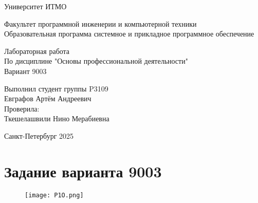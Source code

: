 

\thispagestyle{empty}
\begin{center}
\LARGE{Университет ИТМО} 
\vspace{20pt}

\LARGE{Факультет программной инженерии и компьютерной техники \\
Образовательная программа системное и прикладное программное обеспечение}
\vspace{160pt}

\LARGE{Лабораторная работа   \\
По дисциплине "Основы профессиональной деятельности" \\ 
Вариант 9003}
\vspace{120pt}
\end{center}

\begin{flushright}
\LARGE{Выполнил студент группы P3109 \\ 
Евграфов Артём Андреевич \\
Проверила: \\
Ткешелашвили Нино Мерабиевна}
\vspace{120pt}
\end{flushright}

\begin{center}
\Large{Санкт-Петербург 2025}
\end{center}

\newpage
\setcounter{page}{1}
\tableofcontents
\newpage
\section{Задание варианта 9003}
\begin{figure}[H]
    \centering
    \texttt{[image: P1O.png]}
\end{figure}
